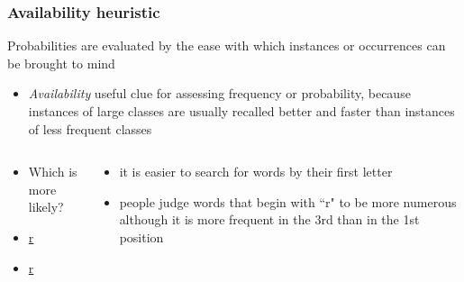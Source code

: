 \documentclass[]{beamer}
\begin{document}
\begin{frame}
 \frametitle{Availability heuristic}
\begin{overlayarea}{110mm}{70mm}
Probabilities are evaluated by the ease with which instances or occurrences can be brought to mind
\begin{itemize}
 \item \textit{Availability} useful clue for assessing frequency or probability, because instances of large classes are usually recalled better and faster than instances of less frequent classes
\end{itemize}


\begin{columns}[T]
 \begin{column}{50mm}
\begin{itemize}
 \item<2->[$\rightarrow$] Which is more likely?
 \item<2->[] \underline{r} \underline{ }  \underline{ }
 \item<2->[] \underline{ } \underline{ }  \underline{r}
\end{itemize}
 \end{column}

 \begin{column}{60mm}
\begin{itemize}
 \item<3-> it is easier to search for words by their first letter
 \item<3->[$\Rightarrow$] people judge words that begin with ``r" to be more numerous although it is more frequent in the 3rd than in the 1st position 
\end{itemize}
 \end{column}
\end{columns}
\end{overlayarea}
\end{frame}
\end{document}
